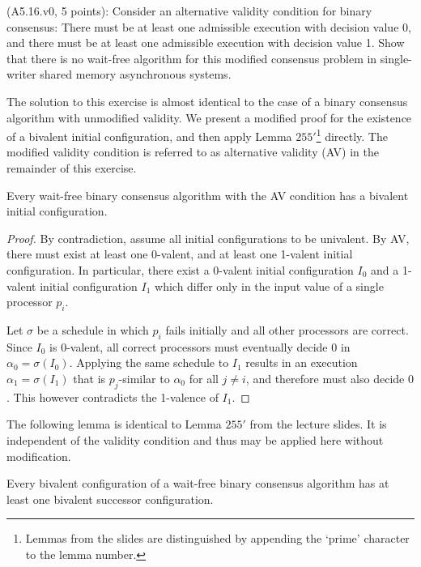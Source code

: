 \begin{Exc}{(A5.16.v0, 5 points):}
Consider an alternative validity condition for binary consensus: There must
be at least one admissible execution with decision value 0, and there
must be at least one admissible execution with decision value 1.
Show that there is no wait-free algorithm for this modified consensus
problem in single-writer shared memory asynchronous systems.
\end{Exc}

The solution to this exercise is almost identical to the case of a binary consensus algorithm
with unmodified validity. We present a modified proof for the existence of a bivalent initial
configuration, and then apply Lemma $255'$\footnote{Lemmas from the slides are
distinguished by appending the `prime' character to the lemma number.} directly. The modified
validity condition is referred to as alternative validity (AV) in the remainder of this exercise.

\begin{lemma}
Every wait-free binary consensus algorithm with the AV condition has a bivalent initial
configuration.
\end{lemma}

\begin{proof}
By contradiction, assume all initial configurations to be univalent. By AV, there must exist
at least one 0-valent, and at least one 1-valent initial configuration. In particular, there exist
a 0-valent initial configuration $I_0$ and a 1-valent initial configuration $I_1$ which differ
only in the input value of a single processor $p_i$.

Let $\sigma$ be a schedule in which $p_i$ fails initially and all other processors are correct.
Since $I_0$ is 0-valent, all correct processors must eventually decide $0$ in $\alpha_0 = \sigma(I_0)$.
Applying the same schedule to $I_1$ results in an execution $\alpha_1 = \sigma(I_1)$ that is
$p_j$-similar to $\alpha_0$ for all $j \neq i$, and therefore must also decide $0$. This however
contradicts the 1-valence of $I_1$.
\end{proof}

The following lemma is identical to Lemma $255'$ from the lecture slides.
It is independent of the validity condition and thus may be applied here without modification.

\begin{lemma}
Every bivalent configuration of a wait-free binary consensus algorithm has at least one bivalent
successor configuration.
\end{lemma}

